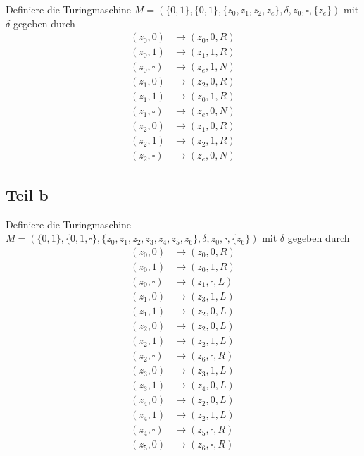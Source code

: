 \documentclass[10pt,a4paper]{article}
\begin{document}
Definiere die Turingmaschine $M = (\{ 0, 1 \}, \{ 0, 1 \}, \{ z_{0}, z_{1}, z_{2}, z_{e} \}, \delta, z_{0}, \square, \{ z_{e} \})$ mit $\delta$ gegeben durch
\begin{align*}
  (z_{0}, 0) & \rightarrow (z_{0}, 0, R)\\
  (z_{0}, 1) & \rightarrow (z_{1}, 1, R)\\
  (z_{0}, \square) & \rightarrow (z_{e}, 1, N)\\
  (z_{1}, 0) & \rightarrow (z_{2}, 0, R)\\
  (z_{1}, 1) & \rightarrow (z_{0}, 1, R)\\
  (z_{1}, \square) & \rightarrow (z_{e}, 0, N)\\
  (z_{2}, 0) & \rightarrow (z_{1}, 0, R)\\
  (z_{2}, 1) & \rightarrow (z_{2}, 1, R)\\
  (z_{2}, \square) & \rightarrow (z_{e}, 0, N)
\end{align*}

\subsection{Teil b}

Definiere die Turingmaschine $M = (\{ 0, 1 \}, \{ 0, 1, \square \}, \{ z_{0}, z_{1}, z_{2}, z_{3}, z_{4}, z_{5}, z_{6} \}, \delta, z_{0}, \square, \{ z_{6} \})$ mit $\delta$ gegeben durch
\begin{align*}
  (z_{0}, 0) & \rightarrow (z_{0}, 0, R)\\
  (z_{0}, 1) & \rightarrow (z_{0}, 1, R)\\
  (z_{0}, \square) & \rightarrow (z_{1}, \square, L)\\
  (z_{1}, 0) & \rightarrow (z_{3}, 1, L)\\
  (z_{1}, 1) & \rightarrow (z_{2}, 0, L)\\
  (z_{2}, 0) & \rightarrow (z_{2}, 0, L)\\
  (z_{2}, 1) & \rightarrow (z_{2}, 1, L)\\
  (z_{2}, \square) & \rightarrow (z_{6}, \square, R)\\
  (z_{3}, 0) & \rightarrow (z_{3}, 1, L)\\
  (z_{3}, 1) & \rightarrow (z_{4}, 0, L)\\
  (z_{4}, 0) & \rightarrow (z_{2}, 0, L)\\
  (z_{4}, 1) & \rightarrow (z_{2}, 1, L)\\
  (z_{4}, \square) & \rightarrow (z_{5}, \square, R)\\
  (z_{5}, 0) & \rightarrow (z_{6}, \square, R)\\
\end{align*}
\end{document}
